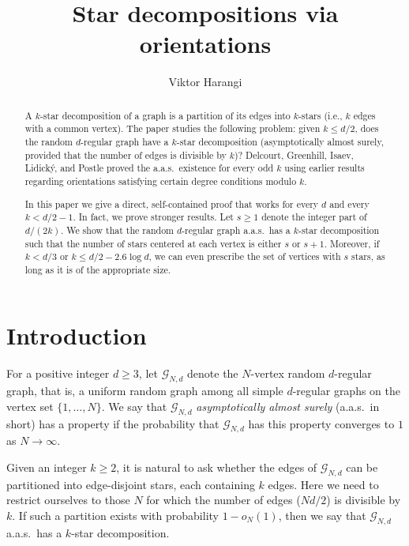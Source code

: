 \documentclass[12pt]{amsart}
\title{Star decompositions via orientations}
\author{Viktor Harangi}
\theoremstyle{definition}
\newcommand\Gc{\mathcal{G}}
\begin{document}
\begin{abstract}
A $k$-star decomposition of a graph is a partition of its edges into $k$-stars (i.e., $k$ edges with a common vertex). The paper studies the following problem: given $k \leq d/2$, does the random $d$-regular graph have a $k$-star decomposition (asymptotically almost surely, provided that the number of edges is divisible by $k$)? Delcourt, Greenhill, Isaev, Lidick\'y, and Postle proved the a.a.s.~existence for every odd $k$ using earlier results regarding orientations satisfying certain degree conditions modulo $k$. 

In this paper we give a direct, self-contained proof that works for every $d$ and every $k<d/2-1$. In fact, we prove stronger results. Let $s\geq 1$ denote the integer part of $d/(2k)$. We show that the random $d$-regular graph a.a.s.~has a $k$-star decomposition such that the number of stars centered at each vertex is either $s$ or $s+1$. Moreover, if $k < d/3$ or $k \leq d/2 - 2.6 \log d$, we can even prescribe the set of vertices with $s$ stars, as long as it is of the appropriate size. 
\end{abstract}



\maketitle

\section{Introduction} \label{sec:intro}

For a positive integer $d \geq 3$, let $\Gc_{N,d}$ denote the $N$-vertex random $d$-regular graph, that is, a uniform random graph among all simple $d$-regular graphs on the vertex set $\{1,\ldots, N\}$. We say that $\Gc_{N,d}$ \emph{asymptotically almost surely} (a.a.s.~in short) has a property if the probability that $\Gc_{N,d}$ has this property converges to $1$ as $N \to \infty$. 

Given an integer $k \geq 2$, it is natural to ask whether the edges of $\Gc_{N,d}$ can be partitioned into edge-disjoint stars, each containing $k$ edges. Here we need to restrict ourselves to those $N$ for which the number of edges ($Nd/2$) is divisible by $k$. If such a partition exists with probability $1-o_N(1)$, then we say that $\Gc_{N,d}$ a.a.s.~has a $k$-star decomposition.
\end{document}
